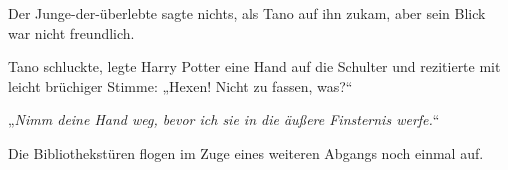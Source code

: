 Der Junge-der-überlebte sagte nichts, als Tano auf ihn zukam, aber sein Blick war nicht freundlich.

Tano schluckte, legte Harry Potter eine Hand auf die Schulter und rezitierte mit leicht brüchiger Stimme:
„Hexen! Nicht zu fassen, was?“

„\emph{Nimm deine Hand weg, bevor ich sie in die äußere Finsternis werfe.}“

Die Bibliothekstüren flogen im Zuge eines weiteren Abgangs noch einmal auf.

